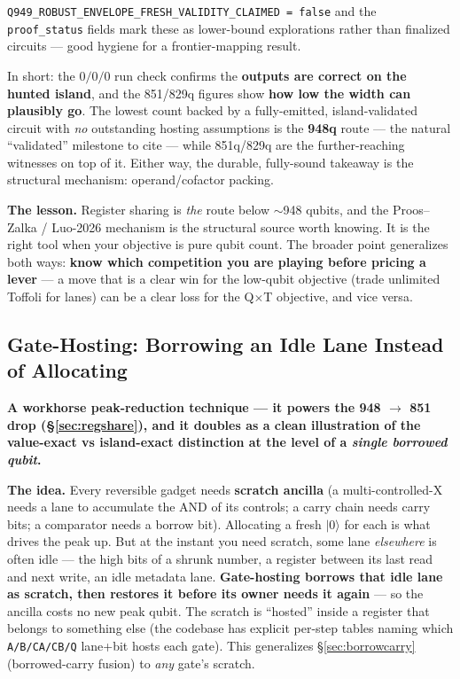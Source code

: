 \documentclass[11pt,a4paper]{article}
\begin{document}
\begin{tcolorbox}[noteboxstyle, title={How to read the 851q figure}]
\begin{itemize}
    \texttt{Q949\_ROBUST\_ENVELOPE\_FRESH\_VALIDITY\_CLAIMED = false} and the \texttt{proof\_status}
    fields mark these as lower-bound explorations rather than finalized circuits --- good hygiene for
    a frontier-mapping result.
\end{itemize}
In short: the $0/0/0$ run check confirms the \textbf{outputs are correct on the hunted island}, and
the 851/829q figures show \textbf{how low the width can plausibly go}. The lowest count backed by a
fully-emitted, island-validated circuit with \emph{no} outstanding hosting assumptions is the
\textbf{948q} route --- the natural ``validated'' milestone to cite --- while 851q/829q are the
further-reaching witnesses on top of it. Either way, the durable, fully-sound takeaway is the
structural mechanism: operand/cofactor packing.
\end{tcolorbox}

\textbf{The lesson.} Register sharing is \emph{the} route below $\sim$948 qubits, and the
Proos--Zalka / Luo-2026 mechanism is the structural source worth knowing. It is the right tool when
your objective is pure qubit count. The broader point generalizes both ways: \textbf{know which
competition you are playing before pricing a lever} --- a move that is a clear win for the low-qubit
objective (trade unlimited Toffoli for lanes) can be a clear loss for the Q$\times$T objective, and
vice versa.

\subsection{Gate-Hosting: Borrowing an Idle Lane Instead of Allocating}
\label{sec:gatehost}

\textbf{A workhorse peak-reduction technique --- it powers the 948 $\to$ 851 drop
(\S\ref{sec:regshare}), and it doubles as a clean illustration of the value-exact vs island-exact
distinction at the level of a \emph{single borrowed qubit}.}

\textbf{The idea.} Every reversible gadget needs \textbf{scratch ancilla} (a multi-controlled-X
needs a lane to accumulate the AND of its controls; a carry chain needs carry bits; a comparator
needs a borrow bit). Allocating a fresh $|0\rangle$ for each is what drives the peak up. But at the
instant you need scratch, some lane \emph{elsewhere} is often idle --- the high bits of a shrunk
number, a register between its last read and next write, an idle metadata lane.
\textbf{Gate-hosting borrows that idle lane as scratch, then restores it before its owner needs it
again} --- so the ancilla costs no new peak qubit. The scratch is ``hosted'' inside a register that
belongs to something else (the codebase has explicit per-step tables naming which \texttt{A/B/CA/CB/Q}
lane+bit hosts each gate). This generalizes \S\ref{sec:borrowcarry} (borrowed-carry fusion) to
\emph{any} gate's scratch.
\end{document}
